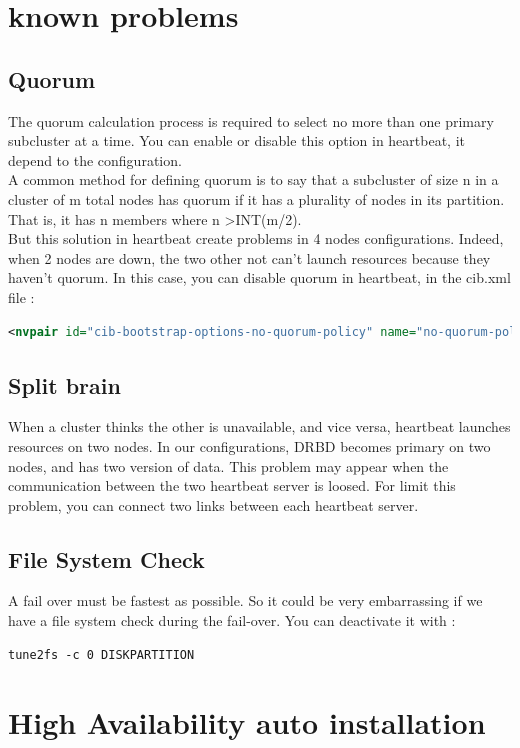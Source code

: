 \documentclass[a4paper,10pt]{report}
\begin{document}
\chapter{known problems}
\section{Quorum}
The quorum calculation process is required to select no more than one primary subcluster at a time. You can enable or disable this option in heartbeat, it depend to the configuration.\\
A common method for defining quorum is to say that a subcluster of size n in a cluster of m total nodes has quorum if it has a plurality of nodes in its partition. That is, it has n members where n \textgreater INT(m/2).\\
But this solution in heartbeat create problems in 4 nodes configurations. Indeed, when 2 nodes are down, the two other not can't launch resources because they haven't quorum. In this case, you
can disable quorum in heartbeat, in the cib.xml file :
\begin{lstlisting}[language=xml]
<nvpair id="cib-bootstrap-options-no-quorum-policy" name="no-quorum-policy" value="ignore"/>
\end{lstlisting}


\section{Split brain}
\label{splitbrain} 
When a cluster thinks the other is unavailable, and vice versa, heartbeat launches resources on two nodes. In our configurations, DRBD becomes primary on two nodes, and has two version of data. This problem may appear when the communication between the two heartbeat server is loosed.
For limit this problem, you can connect two links between each heartbeat server.



\section{File System Check}
A fail over must be fastest as possible. So it could be very embarrassing if we have a file system check during the fail-over. You can deactivate it with :
\begin{lstlisting}
tune2fs -c 0 DISKPARTITION
\end{lstlisting}

\chapter{High Availability auto installation}
\end{document}
